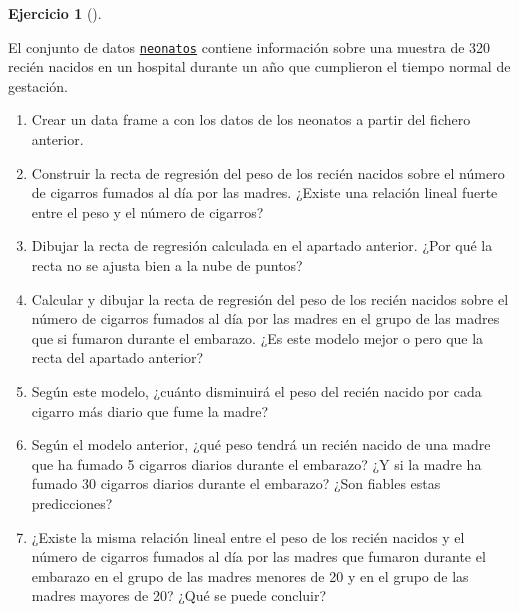 \documentclass[
  a4paper,
]{scrreport}
\theoremstyle{definition}
\newtheorem{exercise}{Ejercicio}[chapter]
\theoremstyle{remark}
\begin{document}
\begin{exercise}[]\protect\hypertarget{exr-regresion-6}{}\label{exr-regresion-6}

El conjunto de datos
\href{https://aprendeconalf.es/estadistica-practicas-r/datos/neonatos.csv}{\texttt{neonatos}}
contiene información sobre una muestra de 320 recién nacidos en un
hospital durante un año que cumplieron el tiempo normal de gestación.

\begin{enumerate}
\def\labelenumi{\alph{enumi}.}
\item
  Crear un data frame a con los datos de los neonatos a partir del
  fichero anterior.
\item
  Construir la recta de regresión del peso de los recién nacidos sobre
  el número de cigarros fumados al día por las madres. ¿Existe una
  relación lineal fuerte entre el peso y el número de cigarros?
\item
  Dibujar la recta de regresión calculada en el apartado anterior. ¿Por
  qué la recta no se ajusta bien a la nube de puntos?
\item
  Calcular y dibujar la recta de regresión del peso de los recién
  nacidos sobre el número de cigarros fumados al día por las madres en
  el grupo de las madres que si fumaron durante el embarazo. ¿Es este
  modelo mejor o pero que la recta del apartado anterior?
\item
  Según este modelo, ¿cuánto disminuirá el peso del recién nacido por
  cada cigarro más diario que fume la madre?
\item
  Según el modelo anterior, ¿qué peso tendrá un recién nacido de una
  madre que ha fumado 5 cigarros diarios durante el embarazo? ¿Y si la
  madre ha fumado 30 cigarros diarios durante el embarazo? ¿Son fiables
  estas predicciones?
\item
  ¿Existe la misma relación lineal entre el peso de los recién nacidos y
  el número de cigarros fumados al día por las madres que fumaron
  durante el embarazo en el grupo de las madres menores de 20 y en el
  grupo de las madres mayores de 20? ¿Qué se puede concluir?
\end{enumerate}

\end{exercise}
\end{document}
